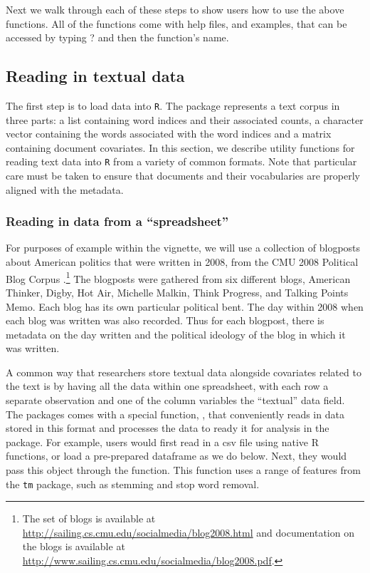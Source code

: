 \documentclass[nojss]{jss}
\begin{document}
Next we walk through each of these steps to show users how to use the above functions. All of the functions come with help files, and examples, that can be accessed by typing ? and then the function's name.

\subsection{Reading in textual data}

The first step is to load data into \texttt{R}. The  package represents a text corpus in three parts: a  list containing word indices and their associated counts, a  character vector containing the words associated with the word indices and a  matrix containing document covariates. In this section, we describe utility functions for reading text data into \texttt{R} from a variety of common formats. Note that particular care must be taken to ensure that documents and their vocabularies are properly aligned with the metadata.


\subsubsection{Reading in data from a ``spreadsheet''}

For purposes of example within the vignette, we will use a collection of blogposts about American politics that were written in 2008, from the CMU 2008 Political Blog Corpus \citep{poliblog}.\footnote{The set of blogs is available at \url{http://sailing.cs.cmu.edu/socialmedia/blog2008.html} and documentation on the blogs is available at \url{http://www.sailing.cs.cmu.edu/socialmedia/blog2008.pdf}.} The blogposts were gathered from six different blogs, American Thinker, Digby, Hot Air, Michelle Malkin, Think Progress, and Talking Points Memo.  Each blog has its own particular political bent.  The day within 2008 when each blog was written was also recorded.  Thus for each blogpost, there is metadata on the day written and the political ideology of the blog in which it was written.

A common way that researchers store textual data alongside covariates related to the text is by having all the data within one spreadsheet, with each row a separate observation and one of the column variables the ``textual'' data field. The  packages comes with a special function, , that conveniently reads in data stored in this format and processes the data to ready it for analysis in the  package.  For example, users would first read in a csv file using native R functions, or load a pre-prepared dataframe as we do below. Next, they would pass this object through the  function. This function uses a range of features from the \texttt{tm} package, such as stemming and stop word removal.
\end{document}
